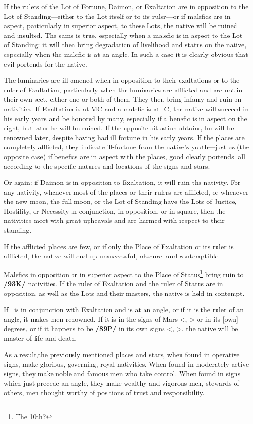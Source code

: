 If the rulers of the Lot of Fortune, Daimon, or Exaltation are in opposition to the Lot of Standing—either to the Lot itself or to its ruler—or if malefics are in aspect, particularly in superior aspect, to these Lots, the native will be ruined and insulted. The same is true, especially when a malefic is in aspect to the Lot of Standing: it will then bring degradation of livelihood and status on the native, especially when the malefic is at an angle. In such a case it is clearly obvious that evil portends for the native.

The luminaries are ill-omened when in opposition to their exaltations or to the ruler of Exaltation, particularly when the luminaries are afflicted and are not in their own sect, either one or both of them. They then bring infamy and ruin on nativities. If Exaltation is at MC and a malefic is at IC, the native will succeed in his early years and be honored by many, especially if a benefic is in aspect on the right, but later he will be ruined. If the opposite situation obtains, he will be renowned later, despite having had ill fortune in his early years. If the places are completely afflicted, they indicate ill-fortune from the native’s youth—just as (the opposite case) if benefics are in aspect with the places, good clearly portends, all according to the specific natures and locations of the signs and stars.

Or again: if Daimon is in opposition to Exaltation, it will ruin the nativity. For any nativity, whenever most of the places or their rulers are afflicted, or whenever the new moon, the full moon, or the Lot of Standing have the Lots of Justice, Hostility, or Necessity in conjunction, in opposition, or in square, then the nativities meet with great upheavals and are harmed with respect to their standing. 

If the afflicted places are few, or if only the Place of Exaltation or its ruler is afflicted, the native will end up unsuccessful, obscure, and contemptible. 

Malefics in opposition or in superior aspect to the Place of Status\footnote{The 10th?} bring ruin to \textbf{/93K/} nativities. If the ruler of Exaltation and the ruler of Status are in opposition, as well as the Lots and their masters, the native is held in contempt. 

If \Jupiter\, is in conjunction with Exaltation and
is at an angle, or if it is the ruler of an angle, it makes men renowned. If it is in the signs of Mars <\Scorpio, \Aries> or in its [own] degrees, or if it happens to be \textbf{/89P/} in its own signs <\Sagittarius, \Pisces>, the native will be master of life and death.

As a result,\mndl the previously mentioned places and stars, when found in operative signs, make glorious, governing, royal nativities. When found in moderately active signs, they make noble and famous men who take control. When found in signs which just precede an angle, they make wealthy and vigorous men, stewards of others, men thought worthy of positions of trust and responsibility.

\newpage